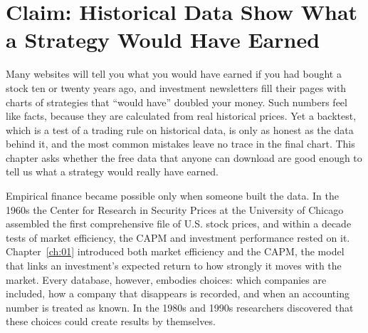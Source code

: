 \makeatletter
{}
\makeatother

\chapter{Claim: Historical Data Show What a Strategy Would Have Earned}
\label{ch:02}

Many websites will tell you what you would have earned if you had bought a stock ten or twenty years ago, and investment newsletters fill their pages with charts of strategies that ``would have'' doubled your money. Such numbers feel like facts, because they are calculated from real historical prices. Yet a backtest, which is a test of a trading rule on historical data, is only as honest as the data behind it, and the most common mistakes leave no trace in the final chart. This chapter asks whether the free data that anyone can download are good enough to tell us what a strategy would really have earned.

Empirical finance became possible only when someone built the data. In the 1960s the Center for Research in Security Prices at the University of Chicago assembled the first comprehensive file of U.S. stock prices, and within a decade tests of market efficiency, the CAPM and investment performance rested on it. Chapter~\ref{ch:01} introduced both market efficiency and the CAPM, the model that links an investment's expected return to how strongly it moves with the market. Every database, however, embodies choices: which companies are included, how a company that disappears is recorded, and when an accounting number is treated as known. In the 1980s and 1990s researchers discovered that these choices could create results by themselves.

